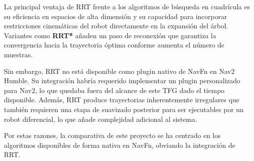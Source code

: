 La principal ventaja de RRT frente a los algoritmos de búsqueda en cuadrícula es su eficiencia en espacios de alta dimensión y su capacidad para incorporar restricciones cinemáticas del robot directamente en la expansión del árbol. Variantes como \textbf{RRT*}\cite{karaman2011} añaden un paso de reconexión que garantiza la convergencia hacia la trayectoria óptima conforme aumenta el número de muestras.

Sin embargo, RRT no está disponible como plugin nativo de NavFn en Nav2 Humble. Su integración habría requerido implementar un plugin personalizado para Nav2, lo que quedaba fuera del alcance de este TFG dado el tiempo disponible. Además, RRT produce trayectorias inherentemente irregulares que también requieren una etapa de suavizado posterior para ser ejecutables por un robot diferencial, lo que añade complejidad adicional al sistema.

Por estas razones, la comparativa de este proyecto se ha centrado en los algoritmos disponibles de forma nativa en NavFn, obviando la integración de RRT.
